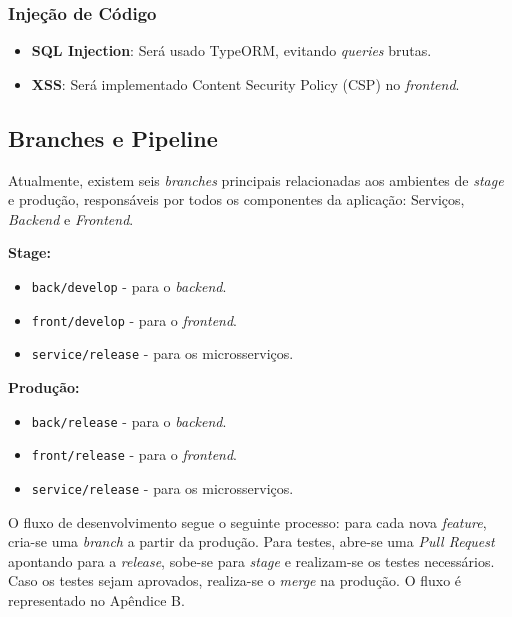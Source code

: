 \documentclass[12pt, a4paper]{article}
\begin{document}
\subsubsection{Injeção de Código}
\begin{spacing}{1.5}
\begin{itemize}
    \item \textbf{SQL Injection}: Será usado TypeORM, evitando \textit{queries} brutas.
    \item \textbf{XSS}: Será implementado Content Security Policy (CSP) no \textit{frontend}.
\end{itemize}
\end{spacing}

\subsection{Branches e Pipeline}
\begin{spacing}{1.5}
Atualmente, existem seis \textit{branches} principais relacionadas aos ambientes de \textit{stage} e produção, responsáveis por todos os componentes da aplicação: Serviços, \textit{Backend} e \textit{Frontend}.

\textbf{Stage:}
\begin{itemize}
    \item \texttt{back/develop} - para o \textit{backend}.
    \item \texttt{front/develop} - para o \textit{frontend}.
    \item \texttt{service/release} - para os microsserviços.
\end{itemize}

\textbf{Produção:}
\begin{itemize}
    \item \texttt{back/release} - para o \textit{backend}.
    \item \texttt{front/release} - para o \textit{frontend}.
    \item \texttt{service/release} - para os microsserviços.
\end{itemize}

O fluxo de desenvolvimento segue o seguinte processo: para cada nova \textit{feature}, cria-se uma \textit{branch} a partir da produção. Para testes, abre-se uma \textit{Pull Request} apontando para a \textit{release}, sobe-se para \textit{stage} e realizam-se os testes necessários. Caso os testes sejam aprovados, realiza-se o \textit{merge} na produção. O fluxo é representado no Apêndice B.
\end{spacing}
\end{document}
